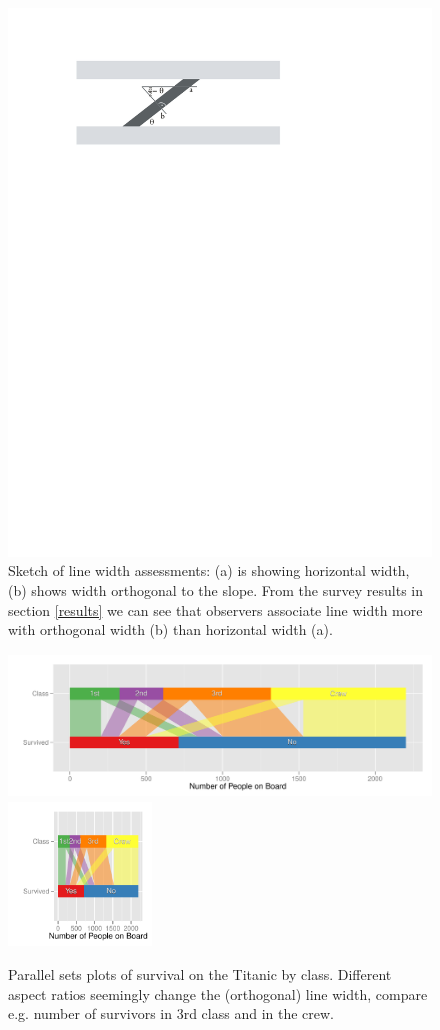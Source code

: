 \begin{figure}[htbp]
\begin{center}
\includegraphics[width=0.6\linewidth]{images/linewidth}
\end{center}
\caption{\label{fig:linewidth}Sketch of line width assessments: (a) is showing  horizontal width, (b) shows  width orthogonal to the slope. From the survey results in section \ref{results} we can see that  observers associate line width more with  orthogonal width (b) than horizontal width (a).}
\end{figure}





\begin{figure}[htbp]
\begin{center}
\includegraphics[height=1.5in]{images/aspect31-titanic.pdf}
\includegraphics[height=1.5in]{images/aspect33-titanic.pdf}
\end{center}
\caption{\label{fig:aspect}Parallel sets plots of survival on the Titanic by class. Different aspect ratios  seemingly change the (orthogonal) line width, compare e.g. number of survivors in 3rd class and in the crew. }
\end{figure}

